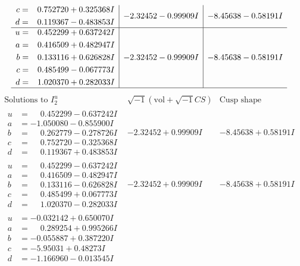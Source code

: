 \documentclass[1p]{elsarticle_modified}
\theoremstyle{definition}
\newcommand{\I}{\sqrt{-1}}
\begin{document}
$$\begin{array}{c|c|c}
\begin{aligned}
c &= \phantom{-}0.752720 + 0.325368 I \\
d &= \phantom{-}0.119367 - 0.483853 I\end{aligned}
 & -2.32452 - 0.99909 I & -8.45638 - 0.58191 I \\ \hline\begin{aligned}
u &= \phantom{-}0.452299 + 0.637242 I \\
a &= \phantom{-}0.416509 + 0.482947 I \\
b &= \phantom{-}0.133116 + 0.626828 I \\
c &= \phantom{-}0.485499 - 0.067773 I \\
d &= \phantom{-}1.020370 + 0.282033 I\end{aligned}
 & -2.32452 - 0.99909 I & -8.45638 - 0.58191 I\\
 \hline 
 \end{array}$$\newpage$$\begin{array}{c|c|c}  
\text{Solutions to }I^u_{2}& \I (\text{vol} + \sqrt{-1}CS) & \text{Cusp shape}\\
 \hline 
\begin{aligned}
u &= \phantom{-}0.452299 - 0.637242 I \\
a &= -1.050080 - 0.855900 I \\
b &= \phantom{-}0.262779 - 0.278726 I \\
c &= \phantom{-}0.752720 - 0.325368 I \\
d &= \phantom{-}0.119367 + 0.483853 I\end{aligned}
 & -2.32452 + 0.99909 I & -8.45638 + 0.58191 I \\ \hline\begin{aligned}
u &= \phantom{-}0.452299 - 0.637242 I \\
a &= \phantom{-}0.416509 - 0.482947 I \\
b &= \phantom{-}0.133116 - 0.626828 I \\
c &= \phantom{-}0.485499 + 0.067773 I \\
d &= \phantom{-}1.020370 - 0.282033 I\end{aligned}
 & -2.32452 + 0.99909 I & -8.45638 + 0.58191 I \\ \hline\begin{aligned}
u &= -0.032142 + 0.650070 I \\
a &= \phantom{-}0.289254 + 0.995266 I \\
b &= -0.055887 + 0.387220 I \\
c &= -5.95031 + 0.48273 I \\
d &= -1.166960 - 0.013545 I\end{aligned}

\end{array}$$
\end{document}
